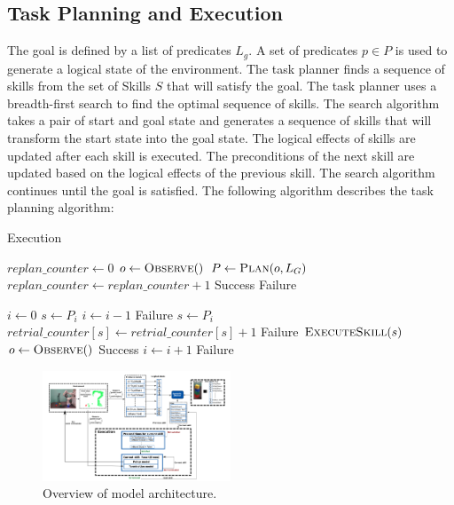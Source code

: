\documentclass[
	a4paper, %
	10pt, %
	unnumberedsections, %
	twoside, %
]{LTJournalArticle}
\begin{document}
\subsection{Task Planning and Execution}
The goal is defined by a list of predicates \(L_g\). A set of predicates \(p \in P\) is used to generate a logical state of the environment. The task planner finds a
sequence of skills from the set of Skills \(S\) that will satisfy the goal. The task planner uses a breadth-first search to find the optimal sequence of skills. 
The search algorithm takes a pair of start and goal state and generates a sequence of skills that will transform the start state into the goal state. The logical effects
of skills are updated after each skill is executed. The preconditions of the next skill are updated based on the logical effects of the previous skill. The search algorithm
continues until the goal is satisfied. The following algorithm describes the task planning algorithm:
\begin{algorithm}
	\caption{Execution}
	\begin{algorithmic}[1]
		\State $replan\_counter \gets 0$
			\State $o \gets \textsc{Observe}()$
			\State $P \gets \textsc{Plan}(o, L_G)$
			\State $replan\_counter \gets replan\_counter + 1$
				\State \Return Success
			\EndIf
		\EndWhile
		\State \Return Failure
	\EndProcedure
	
		\State $i \gets 0$
			\State $s \gets P_i$
				\State $i \gets i - 1$
					\State \Return Failure
				\EndIf
				\State $s \gets P_i$
			\EndWhile
			\State $retrial\_counter[s] \gets retrial\_counter[s] + 1$
				\State \Return Failure
			\EndIf
			\State $\textsc{ExecuteSkill}(s)$
			\State $o \gets \textsc{Observe}()$
				\State \Return Success
			\EndIf
			\State $i \gets i + 1$
		\EndWhile
		\State \Return Failure
	\EndProcedure
\end{algorithmic}
\end{algorithm}	

\begin{figure}[htb]
	\centering
	\includegraphics[width=0.5\textwidth]{figures/arch_diagram.png}
	\caption{Overview of model architecture.}
	\label{fig:archdiagram}
  \end{figure}
  
\end{document}
